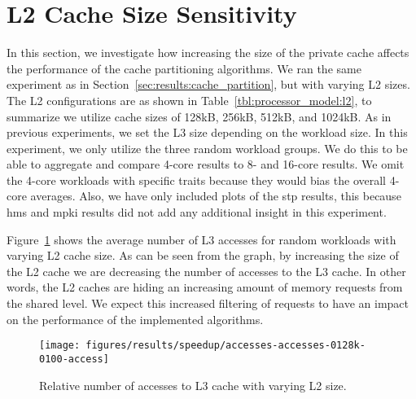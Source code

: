 \section{L2 Cache Size Sensitivity}
\label{sec:results:l2size_sensitivity}

In this section, we investigate how increasing the size of the private cache affects the performance of the cache partitioning algorithms.
We ran the same experiment as in Section~\ref{sec:results:cache_partition}, but with varying L2 sizes.
The L2 configurations are as shown in Table~\ref{tbl:processor_model:l2}, to summarize we utilize cache sizes of 128kB, 256kB, 512kB, and 1024kB.
As in previous experiments, we set the L3 size depending on the workload size.
In this experiment, we only utilize the three random workload groups.
We do this to be able to aggregate and compare 4-core results to 8- and 16-core results.
We omit the 4-core workloads with specific traits because they would bias the overall 4-core averages.
Also, we have only included plots of the \gls{stp} results, this because \gls{hms} and \gls{mpki} results did not add any additional insight in this experiment.

Figure~\ref{fig:results:l2:access} shows the average number of L3 accesses for random workloads with varying L2 cache size.
As can be seen from the graph, by increasing the size of the L2 cache we are decreasing the number of accesses to the L3 cache.
In other words, the L2 caches are hiding an increasing amount of memory requests from the shared level.
We expect this increased filtering of requests to have an impact on the performance of the implemented algorithms.



\begin{figure}[th]
    \centering
    \texttt{[image: figures/results/speedup/accesses-accesses-0128k-0100-access]}
    \caption{Relative number of accesses to L3 cache with varying L2 size.}
    \label{fig:results:l2:access}
\end{figure}

